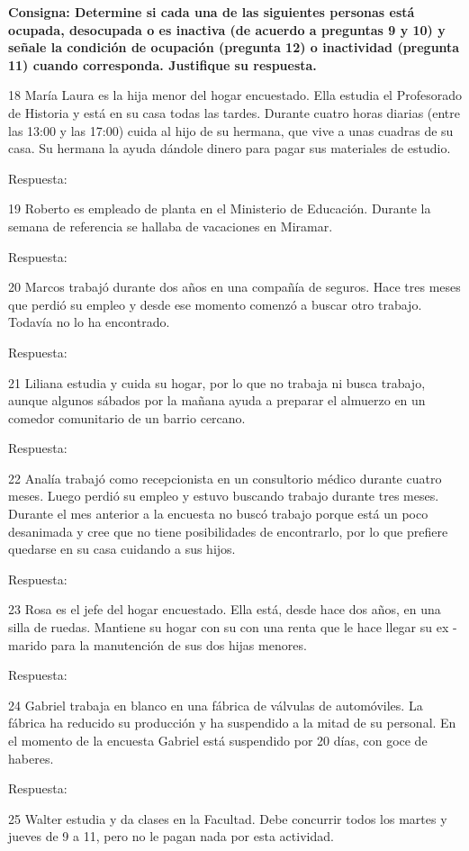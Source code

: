 \documentclass[
  openany]{book}
\begin{document}
\textbf{Consigna: Determine si cada una de las siguientes personas está ocupada, desocupada o es inactiva (de acuerdo a preguntas 9 y 10) y señale la condición de ocupación (pregunta 12) o inactividad (pregunta 11) cuando corresponda. Justifique su respuesta.}

18 María Laura es la hija menor del hogar encuestado. Ella estudia el Profesorado de Historia y está en su casa todas las tardes. Durante cuatro horas diarias (entre las 13:00 y las 17:00) cuida al hijo de su hermana, que vive a unas cuadras de su casa. Su hermana la ayuda dándole dinero para pagar sus materiales de estudio.

Respuesta:

19 Roberto es empleado de planta en el Ministerio de Educación. Durante la semana de referencia se hallaba de vacaciones en Miramar.

Respuesta:

20 Marcos trabajó durante dos años en una compañía de seguros. Hace tres meses que perdió su empleo y desde ese momento comenzó a buscar otro trabajo. Todavía no lo ha encontrado.

Respuesta:

21 Liliana estudia y cuida su hogar, por lo que no trabaja ni busca trabajo, aunque algunos sábados por la mañana ayuda a preparar el almuerzo en un comedor comunitario de un barrio cercano.

Respuesta:

22 Analía trabajó como recepcionista en un consultorio médico durante cuatro meses. Luego perdió su empleo y estuvo buscando trabajo durante tres meses. Durante el mes anterior a la encuesta no buscó trabajo porque está un poco desanimada y cree que no tiene posibilidades de encontrarlo, por lo que prefiere quedarse en su casa cuidando a sus hijos.

Respuesta:

23 Rosa es el jefe del hogar encuestado. Ella está, desde hace dos años, en una silla de ruedas. Mantiene su hogar con su con una renta que le hace llegar su ex - marido para la manutención de sus dos hijas menores.

Respuesta:

24 Gabriel trabaja en blanco en una fábrica de válvulas de automóviles. La fábrica ha reducido su producción y ha suspendido a la mitad de su personal. En el momento de la encuesta Gabriel está suspendido por 20 días, con goce de haberes.

Respuesta:

25 Walter estudia y da clases en la Facultad. Debe concurrir todos los martes y jueves de 9 a 11, pero no le pagan nada por esta actividad.
\end{document}

